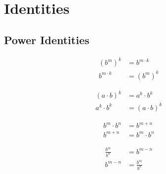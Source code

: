 \documentclass[20150903-160354-rs2.2-MarksMathNotebook.tex]{subfiles}
\begin{document}
%
%

\chapter{Identities}


\section{Power Identities}

\begin{aidentity}
\begin{subequations}
\begin{align}
	(b^m)^k &=b^{m \cdot k} \label{eq:popo1}\\
	b^{m \cdot k} &= (b^m)^k \label{eq:popo2}
\end{align}
\end{subequations}
\end{aidentity}

\begin{aidentity}
\begin{subequations}
\begin{align}
	(a \cdot b)^k &=a^k \cdot b^k \label{eq:popr1}\\
	a^k \cdot b^k &= (a \cdot b)^k \label{eq:popr2}
\end{align}
\end{subequations}
\end{aidentity}

\begin{aidentity}
\begin{subequations}
\begin{align}
	b^m \cdot b^n &=b^{m+n} \label{eq:prcbpo1}\\
	b^{m+n} &= b^m \cdot b^n \label{eq:prcbpo2}
\end{align}
\end{subequations}
\end{aidentity}

\begin{aidentity}
\begin{subequations}
\begin{align}
	\frac{b^m}{b^n} &= b^{m-n} \label{eq:qcbpo1}\\
	b^{m-n} &= \frac{b^m}{b^n} \label{eq:qcbpo2}
\end{align}
\end{subequations}
\end{aidentity}
\end{document}
